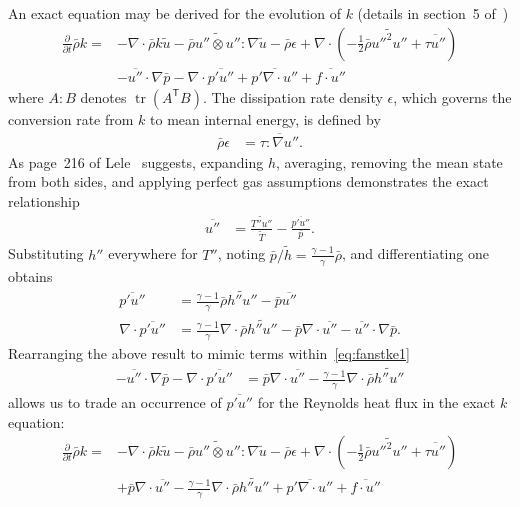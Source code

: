 \documentclass[letterpaper,11pt,nointlimits,reqno,draft]{amsart}
\newcommand{\trans}[1]{{#1}^{\ensuremath{\mathsf{T}}}}
\DeclareMathOperator{\trace}{tr}
\begin{document}
An exact equation may be derived for the evolution of $k$ (details in section~5
of~\cite{OliverFANSModels2011})
\begin{align}
\label{eq:fanstke1}
    \frac{\partial{}}{\partial{}t}\bar{\rho}k
 =
 &- \nabla\cdot\bar{\rho}k\tilde{u}
  - \bar{\rho} \widetilde{u''\otimes{}u''} : \nabla\tilde{u}
  - \bar{\rho} \epsilon
  + \nabla\cdot\left(
        -\frac{1}{2}\bar{\rho}\widetilde{{u''}^{2}u''}
      + \overline{\tau{}u''}
    \right)
\\
 &- \overline{u''}\cdot\nabla\bar{p}
  - \nabla\cdot\overline{p' u''}
  + \overline{p' \nabla\cdot{}u''}
  + \overline{f\cdot{}u''}
\end{align}
where $A:B$ denotes $\trace \left(\trans{A} B\right)$. The dissipation rate
density $\epsilon$, which governs the conversion rate from $k$ to mean internal
energy, is defined by
\begin{align}
  \bar{\rho} \epsilon &= \overline{\tau : \nabla{}u''}
.
\end{align}
As page~216 of Lele~\cite{Lele1994Compressibility} suggests, expanding $h$,
averaging, removing the mean state from both sides, and applying perfect gas
assumptions demonstrates the exact relationship
\begin{align}
  \overline{u''}
&=
  \frac{\widetilde{T''u''}}{\tilde{T}} - \frac{\overline{p'u''}}{\bar{p}}
.
\end{align}
Substituting $h''$ everywhere for $T''$, noting $\bar{p}/\tilde{h} =
\frac{\gamma-1}{\gamma}\bar{\rho}$, and differentiating one obtains
\begin{align}
  \overline{p'u''}
&=
  \frac{\gamma-1}{\gamma} \bar{\rho} \widetilde{h''u''}
- \bar{p} \overline{u''}
\\
  \nabla\cdot \overline{p'u''}
&=
  \frac{\gamma-1}{\gamma} \nabla\cdot \bar{\rho} \widetilde{h''u''}
- \bar{p}\nabla\cdot\overline{u''}
- \overline{u''}\cdot\nabla{}\bar{p}
.
\end{align}
Rearranging the above result to mimic terms within~\eqref{eq:fanstke1}
\begin{align}
  - \overline{u''}\cdot\nabla\bar{p}
  - \nabla\cdot\overline{p'u''}
&=
  \bar{p}\nabla\cdot\overline{u''}
- \frac{\gamma-1}{\gamma} \nabla\cdot \bar{\rho} \widetilde{h''u''}
\end{align}
allows us to trade an occurrence of $\overline{p'u''}$ for the Reynolds heat
flux in the exact $k$ equation:
\begin{align}
\label{eq:fanstke}
    \frac{\partial{}}{\partial{}t}\bar{\rho}k
 =
 &- \nabla\cdot\bar{\rho}k\tilde{u}
  - \bar{\rho} \widetilde{u''\otimes{}u''} : \nabla\tilde{u}
  - \bar{\rho} \epsilon
  + \nabla\cdot\left(
        -\frac{1}{2}\bar{\rho}\widetilde{{u''}^{2}u''}
      + \overline{\tau{}u''}
    \right)
\\
 &+ \bar{p}\nabla\cdot\overline{u''}
  - \frac{\gamma-1}{\gamma} \nabla\cdot\bar{\rho} \widetilde{h''u''}
  + \overline{p' \nabla\cdot{}u''}
  + \overline{f\cdot{}u''}
\end{align}
\end{document}
